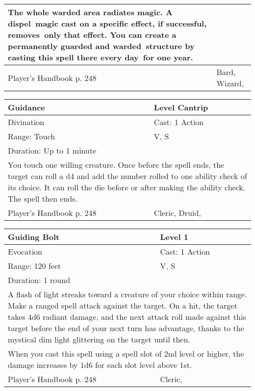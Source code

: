 \documentclass[11pt]{report}
\begin{document}
\begin{table}[H]
\begin{tabular}{||p{6cm}|p{6cm}||}
{The whole warded area radiates magic. A dispel magic cast on a specific effect, if successful, removes only that effect.
You can create a permanently guarded and warded structure by casting this spell there every day for one year.}\\ \hline
Player's Handbook p. 248 & Bard, Wizard, \\ \hline\hline
	\end{tabular}
\end{table}

\begin{table}[H]
	\begin{tabular}{||p{6cm}|p{6cm}||}
		\hline\hline
		\bf{Guidance} & Level Cantrip\\ \hline
		Divination & Cast: 1 Action\\ \hline
		Range: Touch & V, S\\ \hline
		Duration: Up to 1 minute & \\ \hline
		\multicolumn{2}{||p{12cm}||}{You touch one willing creature. Once before the spell ends, the target can roll a d4 and add the number rolled to one ability check of its choice. It can roll the die before or after making the ability check. The spell then ends.}\\ \hline
Player's Handbook p. 248 & Cleric, Druid, \\ \hline\hline
	\end{tabular}
\end{table}

\begin{table}[H]
	\begin{tabular}{||p{6cm}|p{6cm}||}
		\hline\hline
		\bf{Guiding Bolt} & Level 1\\ \hline
		Evocation & Cast: 1 Action\\ \hline
		Range: 120 feet & V, S\\ \hline
		Duration: 1 round & \\ \hline
		\multicolumn{2}{||p{12cm}||}{A flash of light streaks toward a creature of your choice within range.
Make a ranged spell attack against the target. On a hit, the target takes 4d6 radiant damage, and the next attack roll made against this target before the end of your next turn has advantage, thanks to the mystical dim light glittering on the target until then.}\\ \hline
		\multicolumn{2}{||p{12cm}||}{When you cast this spell using a spell slot of 2nd level or higher, the damage increases by 1d6 for each slot level above 1st.}\\ \hline
Player's Handbook p. 248 & Cleric, \\ \hline\hline
	\end{tabular}
\end{table}
\end{document}
